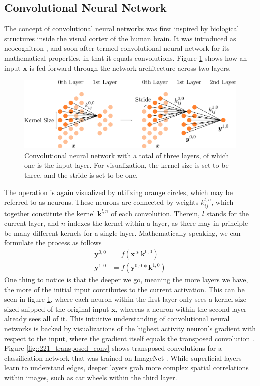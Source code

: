 \subsection{Convolutional Neural Network}
The concept of convolutional neural networks was first inspired by biological structures inside the visual cortex of the human brain. It was introduced as neocognitron \cite{fukushima1980neocognitron}, and soon after termed convolutional neural network for its mathematical properties, in that it equals convolutions. Figure \ref{fig::221_convolutional} shows how an input $\bm{x}$ is fed forward through the network architecture across two layers.   
\begin{figure}[h!]
	\centering
	\includegraphics[scale=.28]{chapters/04_principles_of_machine_learning/img/convolutional.png}
	\caption{Convolutional neural network with a total of three layers, of which one is the input layer. For visualization, the kernel size is set to be three, and the stride is set to be one.}
	\label{fig::221_convolutional}
\end{figure}
The operation is again visualized by utilizing orange circles, which may be referred to as neurons. These neurons are connected by weights $k^{l,n}_{ij}$, which together constitute the kernel $\bm{k}^{l,n}$ of each convolution. Therein, $l$ stands for the current layer, and $n$ indexes the kernel within a layer, as there may in principle be many different kernels for a single layer. Mathematically speaking, we can formulate the process as follows
\begin{align}
	\bm{y}^{0,0} &= f(\bm{x}*\bm{k}^{0,0}) \\
	\bm{y}^{1,0} &= f(\bm{y}^{0,0}*\bm{k}^{1,0})	
\end{align}
One thing to notice is that the deeper we go, meaning the more layers we have, the more of the initial input contributes to the current activation. This can be seen in figure \ref{fig::221_convolutional}, where each neuron within the first layer only sees a kernel size sized snipped of the original input $\bm{x}$, whereas a neuron within the second layer already sees all of it. This intuitive understanding of convolutional neural networks is backed by visualizations of the highest activity neuron's gradient with respect to the input, where the gradient itself equals the transposed convolution \cite{simonyan2013deep}.  Figure \ref{fig::221_transposed_conv} shows transposed convolutions for a classification network that was trained on ImageNet \cite{deng2009imagenet}. While superficial layers learn to understand edges, deeper layers grab more complex spatial correlations within images, such as car wheels within the third layer.

